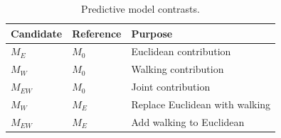 \begin{table}[H]\centering\small
\caption{Predictive model contrasts.}
\label{tab:method-contrasts}
\begin{tabular}{lll}\toprule
Candidate & Reference & Purpose \\
\midrule
$M_E$ & $M_0$ & Euclidean contribution \\
$M_W$ & $M_0$ & Walking contribution \\
$M_{EW}$ & $M_0$ & Joint contribution \\
$M_W$ & $M_E$ & Replace Euclidean with walking \\
$M_{EW}$ & $M_E$ & Add walking to Euclidean \\
\bottomrule\end{tabular}\end{table}
